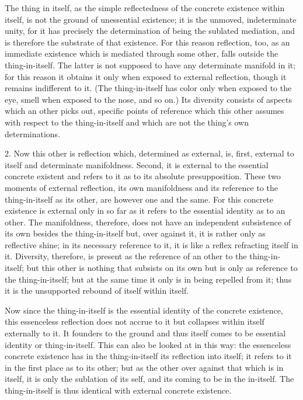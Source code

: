 The thing in itself, as the simple reflectedness of
the concrete existence within itself, 
is not the ground of unessential existence;
it is the unmoved, indeterminate unity,
for it has precisely the determination of 
being the sublated mediation,
and is therefore the substrate of that existence.
For this reason reflection, too,
as an immediate existence
which is mediated through some other, 
falls outside the thing-in-itself.
The latter is not supposed to have 
any determinate manifold in it; 
for this reason it obtains it only
when exposed to external reflection, 
though it remains indifferent to it. 
(The thing-in-itself has color only when exposed to the eye,
smell when exposed to the nose, and so on.) 
Its diversity consists of aspects which an other picks out, 
specific points of reference which this other assumes
with respect to the thing-in-itself 
and which are not the thing's own determinations.

2. Now this other is reflection 
which, determined as external, is,
first, external to itself and determinate manifoldness. 
Second, it is external to the essential concrete existent
and refers to it as to its absolute presupposition.
These two moments of external reflection, 
its own manifoldness and its reference to
the thing-in-itself as its other,
are however one and the same.
For this concrete existence is
external only in so far as it refers to 
the essential identity as to an other. 
The manifoldness, therefore, does not have
an independent  subsistence of its own
besides the thing-in-itself 
but, over against it, 
it is rather only as reflective shine;
in its necessary reference to it,
it is like a reflex refracting itself in it. 
Diversity, therefore, is present as the reference 
of an other to the thing-in-itself; 
but this other is nothing that subsists on its own 
but is only as reference to the thing-in-itself;
but at the same time it only is in being repelled from it; 
thus it is the unsupported rebound of itself within itself.

Now since the thing-in-itself is 
the essential identity of the concrete existence, 
this essenceless reflection does not accrue to it
but collapses within itself externally to it. 
It founders to the ground 
and thus itself comes to be essential identity
or thing-in-itself.
This can also be looked at in this way: 
the essenceless concrete existence has
in the thing-in-itself its reflection into itself; 
it refers to it in the first place as to its other;
but as the other over against that which is in itself,
it is only the sublation of its self,
and its coming to be in the in-itself. 
The thing-in-itself is thus identical
with external concrete existence.

